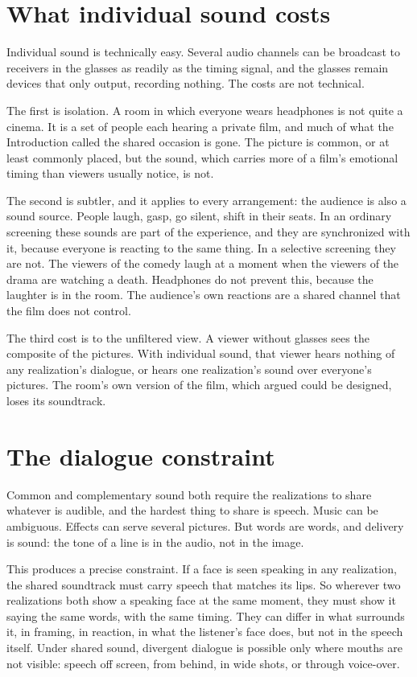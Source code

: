 \section{What individual sound costs}

Individual sound is technically easy. Several audio channels can be broadcast to receivers in the glasses as readily as the timing signal, and the glasses remain devices that only output, recording nothing. The costs are not technical.

The first is isolation. A room in which everyone wears headphones is not quite a cinema. It is a set of people each hearing a private film, and much of what the Introduction called the shared occasion is gone. The picture is common, or at least commonly placed, but the sound, which carries more of a film's emotional timing than viewers usually notice, is not.

The second is subtler, and it applies to every arrangement: the audience is also a sound source. People laugh, gasp, go silent, shift in their seats. In an ordinary screening these sounds are part of the experience, and they are synchronized with it, because everyone is reacting to the same thing. In a selective screening they are not. The viewers of the comedy laugh at a moment when the viewers of the drama are watching a death. Headphones do not prevent this, because the laughter is in the room. The audience's own reactions are a shared channel that the film does not control.

The third cost is to the unfiltered view. A viewer without glasses sees the composite of the pictures. With individual sound, that viewer hears nothing of any realization's dialogue, or hears one realization's sound over everyone's pictures. The room's own version of the film, which  argued could be designed, loses its soundtrack.

\section{The dialogue constraint}

Common and complementary sound both require the realizations to share whatever is audible, and the hardest thing to share is speech. Music can be ambiguous. Effects can serve several pictures. But words are words, and delivery is sound: the tone of a line is in the audio, not in the image.

This produces a precise constraint. If a face is seen speaking in any realization, the shared soundtrack must carry speech that matches its lips. So wherever two realizations both show a speaking face at the same moment, they must show it saying the same words, with the same timing. They can differ in what surrounds it, in framing, in reaction, in what the listener's face does, but not in the speech itself. Under shared sound, divergent dialogue is possible only where mouths are not visible: speech off screen, from behind, in wide shots, or through voice-over.

